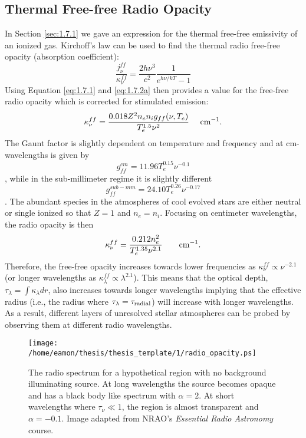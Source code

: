 \subsection{Thermal Free-free Radio Opacity}\label{sec:1.8.3}
In Section \ref{sec:1.7.1} we gave an expression for the thermal free-free emissivity of an ionized gas. Kirchoff's law can be used to find the thermal radio free-free opacity (absorption coefficient):
\begin{equation}
\frac{j_{\nu}^{ff}}{\kappa _{\nu}^{ff}}=\frac{2h\nu ^3}{c^2}\frac{1}{e^{h\nu /kT}-1}
\end{equation}
Using Equation \ref{eq:1.7.1} and \ref{eq:1.7.2a} then provides a value for the free-free radio opacity which is corrected for stimulated emission:
\begin{equation}
\kappa _{\nu}^{ff} = \frac{0.018Z^2n_{e}n_{i}g_{ff}(\nu ,T_{e})}{T_{e}^{1.5}\nu ^{2}}\ \ \ \ \rm{cm^{-1}}.
\end{equation}
The Gaunt factor is slightly dependent on temperature and frequency and at cm-wavelengths is given by
\begin{equation}
g_{ff}^{cm}=11.96T_{e}^{0.15}\nu ^{-0.1}
\end{equation}
\citep{Altenhoff_1960}, while in the  sub-millimeter regime it is slightly different
\begin{equation}
g_{ff}^{sub-mm}=24.10T_{e}^{0.26}\nu ^{-0.17}
\end{equation}
\citep{harper_2013,hummer_1988}. The abundant species in the atmospheres of cool evolved stars are either neutral or single ionized so that $Z=1$ and $n_{e} = n_{i}$. Focusing on centimeter wavelengths, the radio opacity is then
\begin{equation}\label{eq:1.22}
\kappa _{\nu}^{ff} = \frac{0.212n_{e}^2}{T_{e}^{1.35}\nu ^{2.1}}\ \ \ \ \ \ \rm{cm}^{-1}.
\end{equation}
Therefore, the free-free opacity increases towards lower frequencies as $\kappa _{\nu}^{ff} \propto \nu ^{-2.1}$ (or longer wavelengths as $\kappa _{\lambda}^{ff} \propto \lambda ^{2.1}$). This means that the optical depth, $\tau _{\lambda}= \int \kappa _{\lambda} dr$, also increases towards longer wavelengths implying that the effective radius (i.e., the radius where $\tau _{\lambda} = \tau _{\rm{radial}}$) will increase with longer wavelengths. As a result, different layers of unresolved stellar atmospheres can be probed by observing them at different radio wavelengths.

\begin{figure}[ht!]
\centering 
          \texttt{[image: /home/eamon/thesis/thesis\_template/1/radio\_opacity.ps]}
\caption[ region radio spectrum]{The radio spectrum for a hypothetical  region with no background illuminating source. At long wavelengths the source becomes opaque and has a black body like spectrum with $\alpha = 2$. At short wavelengths where $\tau _{\nu} \ll 1$, the  region is almost transparent and $\alpha = -0.1$. Image adapted from NRAO's \textit{Essential Radio Astronomy} course.}
\label{fig:1.5.3}
\end{figure}


